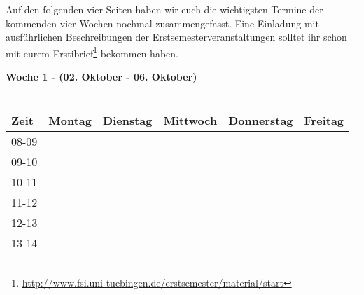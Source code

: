 Auf den folgenden vier Seiten haben wir euch die wichtigsten Termine der kommenden vier Wochen nochmal zusammengefasst. Eine Einladung mit ausführlichen Beschreibungen der Erstsemesterveranstaltungen solltet ihr schon mit eurem Erstibrief\footnote{\url{http://www.fsi.uni-tuebingen.de/erstsemester/material/start}} bekommen haben.




\textbf{Woche 1 - (02. Oktober - 06. Oktober)}\\
\\
\begin{table}[!h]
	\begin{tabular}{|l|p{}|p{}|p{}|p{}|p{}|}
	\hline
	Zeit  & Montag                          & Dienstag                    & Mittwoch                                              & Donnerstag                      & Freitag                                           \\ \hline
	08-09 &                                 &                             &                                                       &                                 &                                                   \\ \cline{1-2} \cline{4-6} 
	09-10 &                                 &                             &                                                       &                                 &                                                   \\ \cline{1-1}
	10-11 &                                 &                             &                                                       &                                 &                                                   \\ \cline{1-1}
	11-12 &                                 &                             &                                                       &                                 &                                                   \\ \cline{1-1}
	12-13 &                                 &                             &                                                       &                                 &                                                   \\ \cline{1-1}
	13-14 &                                 &                             &                                                       &                                 &                                                   \\ \cline{1-1}

\end{tabular}
\end{table}
